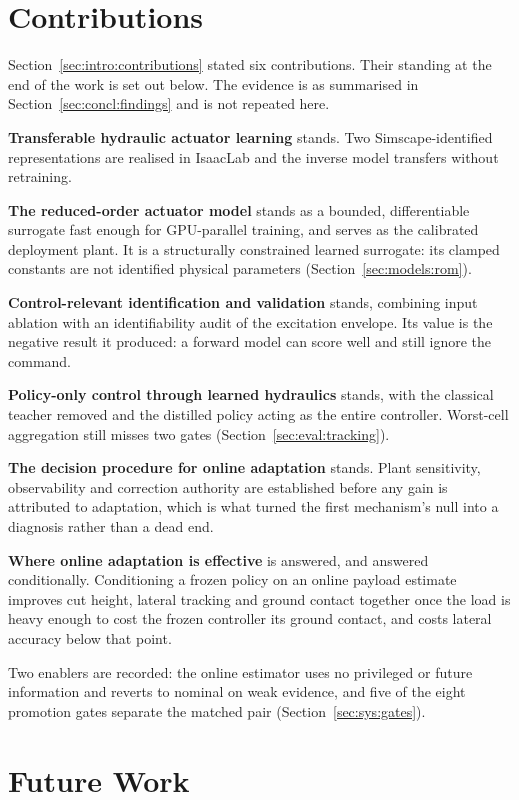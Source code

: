 \section{Contributions}

Section~\ref{sec:intro:contributions} stated six contributions. Their standing
at the end of the work is set out below. The evidence is as summarised in
Section~\ref{sec:concl:findings} and is not repeated here.

\textbf{Transferable hydraulic actuator learning} stands. Two
Simscape-identified representations are realised in IsaacLab and the inverse
model transfers without retraining.

\textbf{The reduced-order actuator model} stands as a bounded, differentiable
surrogate fast enough for GPU-parallel training, and serves as the calibrated
deployment plant. It is a structurally constrained learned surrogate: its
clamped constants are not identified physical parameters
(Section~\ref{sec:models:rom}).

\textbf{Control-relevant identification and validation} stands, combining input
ablation with an identifiability audit of the excitation envelope. Its value is
the negative result it produced: a forward model can score well and still ignore
the command.

\textbf{Policy-only control through learned hydraulics} stands, with the
classical teacher removed and the distilled policy acting as the entire
controller. Worst-cell aggregation still misses two gates
(Section~\ref{sec:eval:tracking}).

\textbf{The decision procedure for online adaptation} stands. Plant
sensitivity, observability and correction authority are established before any
gain is attributed to adaptation, which is what turned the first mechanism's
null into a diagnosis rather than a dead end.

\textbf{Where online adaptation is effective} is answered, and answered
conditionally. Conditioning a frozen policy on an online payload estimate
improves cut height, lateral tracking and ground contact together once the load
is heavy enough to cost the frozen controller its ground contact, and costs
lateral accuracy below that point.

Two enablers are recorded: the online estimator uses no privileged or future
information and reverts to nominal on weak evidence, and five of the eight
promotion gates separate the matched pair (Section~\ref{sec:sys:gates}).

\section{Future Work}
\label{sec:concl:future}

